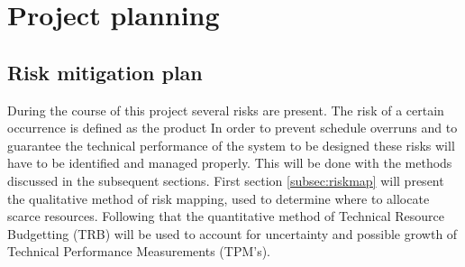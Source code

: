 \section{Project planning}\label{cha:plan}

\subsection{Risk mitigation plan}
\label{sec:riskmit}
During the course of this project several risks are present. The risk of a certain occurrence is defined as the product  In order to prevent schedule overruns and to guarantee the technical performance of the system to be designed these risks will have to be identified and managed properly. This will be done with the methods discussed in the subsequent sections. First section \ref{subsec:riskmap} will present the qualitative method of risk mapping, used to determine where to allocate scarce resources. Following that the quantitative method of Technical Resource Budgetting (TRB) will be used to account for uncertainty and possible growth of Technical Performance Measurements (TPM's).


